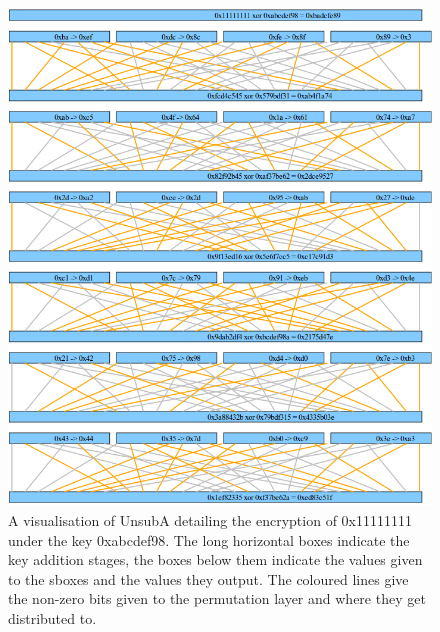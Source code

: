 \documentclass[12pt,a4paper]{article}
\newcommand{\hex}[1] {0x#1}
\begin{document}
\begin{figure}[P]
\includegraphics[width=\textwidth]{diagrams/encryption}
\caption[Visualisation of UnsubA Encryption]{A visualisation of UnsubA detailing the encryption of \hex{11111111}
under the key \hex{abcdef98}. The long horizontal boxes indicate the key addition
stages, the boxes below them indicate the values given to the sboxes and the
values they output. The coloured lines give the non-zero bits given to the
permutation layer and where they get distributed to.}
\label{fig:enc}
\end{figure}
\newpage
{}

\end{document}
